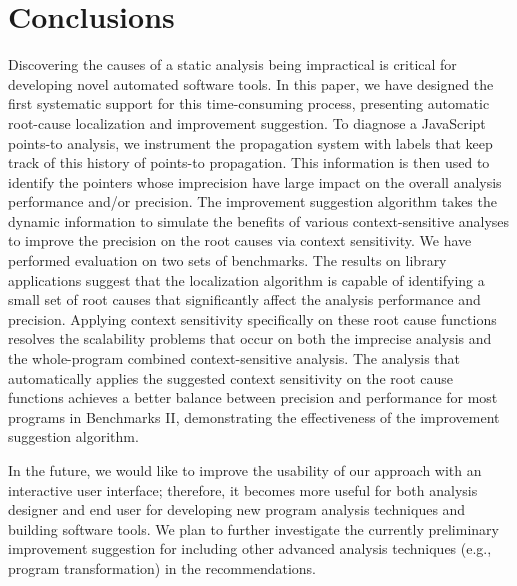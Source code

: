 \section{Conclusions}
\label{concl}

Discovering the causes of a static analysis being impractical is critical for developing novel automated software tools. In this paper, we have designed the first systematic support for this time-consuming process, presenting automatic root-cause localization and improvement suggestion. To diagnose a JavaScript points-to analysis, we instrument the propagation system with labels that keep track of this history of points-to propagation. This information is then used to identify the pointers whose imprecision have large impact on the overall analysis performance and/or precision. The improvement suggestion algorithm takes the dynamic information to simulate the benefits of various context-sensitive analyses to improve the precision on the root causes via context sensitivity. We have performed evaluation on two sets of benchmarks. The results on library applications suggest that the localization algorithm is capable of identifying a small set of root causes that significantly affect the analysis performance and precision. Applying context sensitivity specifically on these root cause functions resolves the scalability problems that occur on both the imprecise analysis and the whole-program combined context-sensitive analysis. The analysis that automatically applies the suggested context sensitivity on the root cause functions achieves a better balance between precision and performance for most programs in Benchmarks II, demonstrating the effectiveness of the improvement suggestion algorithm.

In the future, we would like to improve the usability of our approach with an interactive user interface; therefore, it becomes more useful for both analysis designer and end user for developing new program analysis techniques and building software tools. We plan to further investigate the currently preliminary improvement suggestion for including other advanced analysis techniques (e.g., program transformation) in the recommendations.